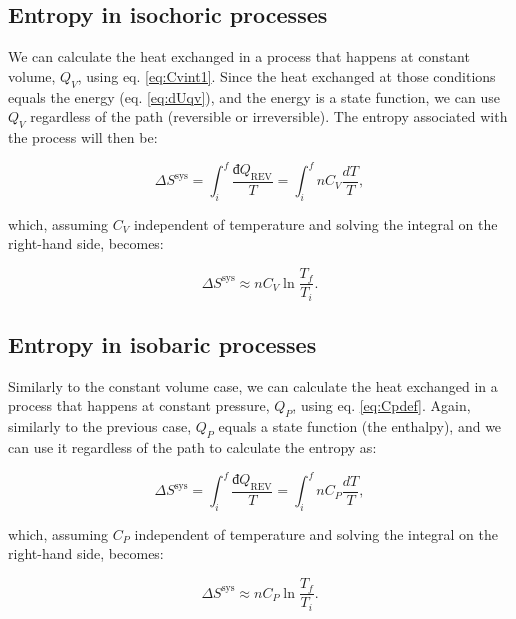 \documentclass[
  9pt,
]{extbook}
\theoremstyle{definition}
\theoremstyle{definition}
\theoremstyle{definition}
\theoremstyle{remark}
\begin{document}
\hypertarget{entropy-in-isochoric-processes}{%
\subsection{Entropy in isochoric processes}\label{entropy-in-isochoric-processes}}

We can calculate the heat exchanged in a process that happens at constant volume, \(Q_V\), using eq. \eqref{eq:Cvint1}. Since the heat exchanged at those conditions equals the energy (eq. \eqref{eq:dUqv}), and the energy is a state function, we can use \(Q_V\) regardless of the path (reversible or irreversible). The entropy associated with the process will then be:

\begin{equation}
\Delta S^{\mathrm{sys}} = \int_i^f \frac{đQ_{\mathrm{REV}}}{T} = \int_i^f nC_V \frac{dT}{T},
\label{eq:sconstV1}
\end{equation}

which, assuming \(C_V\) independent of temperature and solving the integral on the right-hand side, becomes:

\begin{equation}
\Delta S^{\mathrm{sys}} \approx n C_V \ln \frac{T_f}{T_i}.
\label{eq:sconstV}
\end{equation}

\hypertarget{entropy-in-isobaric-processes}{%
\subsection{Entropy in isobaric processes}\label{entropy-in-isobaric-processes}}

Similarly to the constant volume case, we can calculate the heat exchanged in a process that happens at constant pressure, \(Q_P\), using eq. \eqref{eq:Cpdef}. Again, similarly to the previous case, \(Q_P\) equals a state function (the enthalpy), and we can use it regardless of the path to calculate the entropy as:

\begin{equation}
\Delta S^{\mathrm{sys}} = \int_i^f \frac{đQ_{\mathrm{REV}}}{T} = \int_i^f nC_P \frac{dT}{T},
\label{eq:sconstP1}
\end{equation}

which, assuming \(C_P\) independent of temperature and solving the integral on the right-hand side, becomes:

\begin{equation}
\Delta S^{\mathrm{sys}} \approx n C_P \ln \frac{T_f}{T_i}.
\label{eq:sconstP}
\end{equation}
\end{document}
